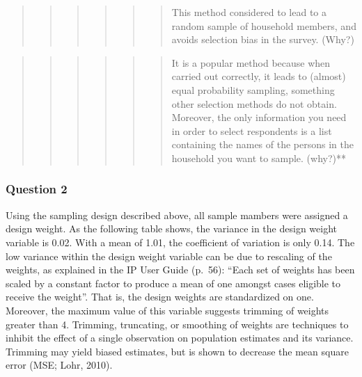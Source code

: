 \documentclass[]{article}
\begin{document}
\begin{quote}
\begin{quote}
\begin{quote}
\begin{quote}
\begin{quote}
\begin{quote}
This method considered to lead to a random sample of household members,
and avoids selection bias in the survey. (Why?)
\end{quote}
\end{quote}
\end{quote}
\end{quote}
\end{quote}
\end{quote}

\begin{quote}
\begin{quote}
\begin{quote}
\begin{quote}
\begin{quote}
\begin{quote}
It is a popular method because when carried out correctly, it leads to
(almost) equal probability sampling, something other selection methods
do not obtain. Moreover, the only information you need in order to
select respondents is a list containing the names of the persons in the
household you want to sample. (why?)**
\end{quote}
\end{quote}
\end{quote}
\end{quote}
\end{quote}
\end{quote}

\subsubsection{Question 2}\label{question-2}

Using the sampling design described above, all sample mambers were
assigned a design weight. As the following table shows, the variance in
the design weight variable is 0.02. With a mean of 1.01, the coefficient
of variation is only 0.14. The low variance within the design weight
variable can be due to rescaling of the weights, as explained in the IP
User Guide (p.~56): ``Each set of weights has been scaled by a constant
factor to produce a mean of one amongst cases eligible to receive the
weight''. That is, the design weights are standardized on one. Moreover,
the maximum value of this variable suggests trimming of weights greater
than 4. Trimming, truncating, or smoothing of weights are techniques to
inhibit the effect of a single observation on population estimates and
its variance. Trimming may yield biased estimates, but is shown to
decrease the mean square error (MSE; Lohr, 2010).
\end{document}
